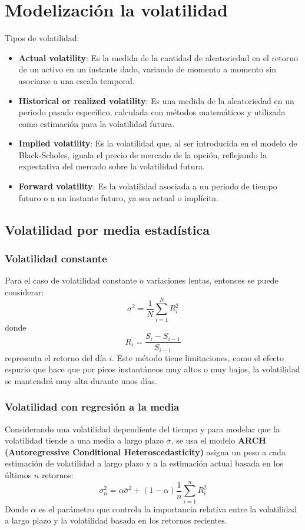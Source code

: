 \section{Modelización la volatilidad}
Tipos de volatilidad:
\begin{itemize}
    \item \textbf{Actual volatility}: Es la medida de la cantidad de aleatoriedad en el retorno de un activo en un instante dado, variando de momento a momento sin asociarse a una escala temporal.
    \item \textbf{Historical or realized volatility}: Es una medida de la aleatoriedad en un periodo pasado específico, calculada con métodos matemáticos y utilizada como estimación para la volatilidad futura.
    \item \textbf{Implied volatility}: Es la volatilidad que, al ser introducida en el modelo de Black-Scholes, iguala el precio de mercado de la opción, reflejando la expectativa del mercado sobre la volatilidad futura.
    \item \textbf{Forward volatility}: Es la volatilidad asociada a un periodo de tiempo futuro o a un instante futuro, ya sea actual o implícita.
\end{itemize}



\subsection{Volatilidad por media estadística}

\subsubsection{Volatilidad constante}
Para el caso de volatilidad constante o variaciones lentas, entonces se puede considerar:
\[
\boxed{\sigma^2 = \frac{1}{N} \sum_{i=1}^{N} R_i^2}
\]
donde 
\[
R_i = \frac{S_i - S_{i-1}}{S_{i-1}}
\]
representa el retorno del día $i$. Este método tiene limitaciones, como el efecto espurio que hace que por picos instantáneos muy altos o muy bajos, la volatilidad se mantendrá muy alta durante unos días.


\subsubsection{Volatilidad con regresión a la media}
Considerando una volatilidad dependiente del tiempo y para modelar que la volatilidad tiende a una media a largo plazo $\overline{\sigma}$, se usa el modelo \textbf{ARCH (Autoregressive Conditional Heteroscedasticity)} asigna un peso a cada estimación de volatilidad a largo plazo y a la estimación actual basada en los últimos $n$ retornos:
\[
\boxed{\sigma_n^2 = \alpha \overline{\sigma}^2 + (1 - \alpha) \frac{1}{n} \sum_{i=1}^{n} R_i^2}
\]
Donde $\alpha$ es el parámetro que controla la importancia relativa entre la volatilidad a largo plazo y la volatilidad basada en los retornos recientes.



